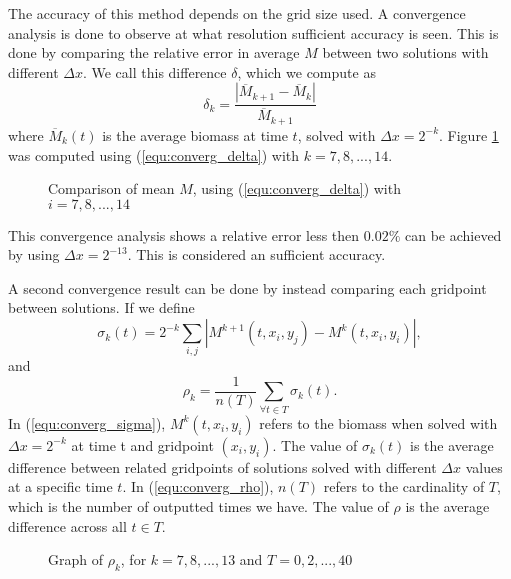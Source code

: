   The accuracy of this method depends on the grid size used. A convergence analysis is done to observe at what resolution sufficient accuracy is seen. This is done by comparing the relative error in average $M$ between two solutions with different $\Delta x$. We call this difference $\delta$, which we compute as
  \begin{equation} \label{equ:converg_delta}
      \delta_k = \frac{\left|\overline{M}_{k+1} - \overline{M}_{k} \right|}{\overline{M}_{k+1}}
  \end{equation}
  where $\overline{M}_{k}(t)$ is the average biomass at time $t$, solved with $\Delta x = 2^{-k}$. Figure \ref{fig:converg_average} was computed using (\ref{equ:converg_delta}) with $k = 7,8,...,14$. 
  
  
  \begin{figure}[!htb]
    \centering
          \caption{Comparison of mean $M$, using (\ref{equ:converg_delta}) with $i = 7,8,...,14$}
          \label{fig:converg_average}
  \end{figure}
  
  This convergence analysis shows a relative error less then $0.02\%$ can be achieved by using $\Delta x = 2^{-13}$. This is considered an sufficient accuracy.
  
  A second convergence result can be done by instead comparing each gridpoint between solutions. If we define 
  \begin{equation} \label{equ:converg_sigma}
      \sigma_k(t) = 2^{-k} \sum_{i,j} |M^{k+1}(t, x_i, y_j) - M^k(t, x_i, y_i)|,
  \end{equation}
  and 
  \begin{equation} \label{equ:converg_rho}
      \rho_k = \frac{1}{n(T)} \sum_{\forall t \in T} \sigma_k(t).
  \end{equation}
  In (\ref{equ:converg_sigma}), $M^{k}(t,x_i,y_i)$ refers to the biomass when solved with $\Delta x = 2^{-k}$ at time t and gridpoint $(x_i, y_i)$. The value of $\sigma_k(t)$ is the average difference between related gridpoints of solutions solved with different $\Delta x$ values at a specific time $t$. In (\ref{equ:converg_rho}), $n(T)$ refers to the cardinality of $T$, which is the number of outputted times we have. The value of $\rho$ is the average difference across all $t \in T$. 
  
  \begin{figure}[!htb]
    \centering
          \caption{Graph of $\rho_k$, for $k = 7,8,...,13$ and $T = 0,2,...,40$}
          \label{fig:converg_rho}
  \end{figure}
  
